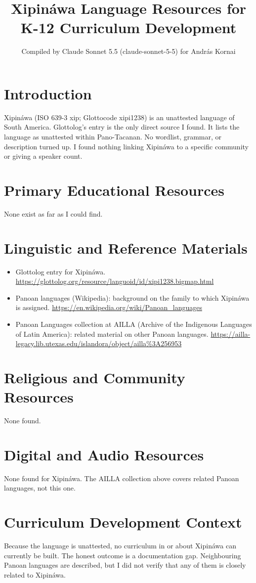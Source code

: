 \documentclass[12pt]{article}
\title{Xipin\'awa Language Resources for K-12 Curriculum Development}
\author{Compiled by Claude Sonnet 5.5 (claude-sonnet-5-5) for Andr\'as Kornai}
\date{}
\begin{document}
\maketitle

\section{Introduction}
Xipin\'awa (ISO 639-3 xip; Glottocode xipi1238) is an unattested language of South America. Glottolog's entry is the only direct source I found. It lists the language as unattested within Pano-Tacanan. No wordlist, grammar, or description turned up. I found nothing linking Xipin\'awa to a specific community or giving a speaker count.

\section{Primary Educational Resources}
None exist as far as I could find.

\section{Linguistic and Reference Materials}
\begin{itemize}
\item Glottolog entry for Xipin\'awa. \url{https://glottolog.org/resource/languoid/id/xipi1238.bigmap.html}
\item Panoan languages (Wikipedia): background on the family to which Xipin\'awa is assigned. \url{https://en.wikipedia.org/wiki/Panoan_languages}
\item Panoan Languages collection at AILLA (Archive of the Indigenous Languages of Latin America): related material on other Panoan languages. \url{https://ailla-legacy.lib.utexas.edu/islandora/object/ailla%3A256953}
\end{itemize}

\section{Religious and Community Resources}
None found.

\section{Digital and Audio Resources}
None found for Xipin\'awa. The AILLA collection above covers related Panoan languages, not this one.

\section{Curriculum Development Context}
Because the language is unattested, no curriculum in or about Xipin\'awa can currently be built. The honest outcome is a documentation gap. Neighbouring Panoan languages are described, but I did not verify that any of them is closely related to Xipin\'awa.
\end{document}
